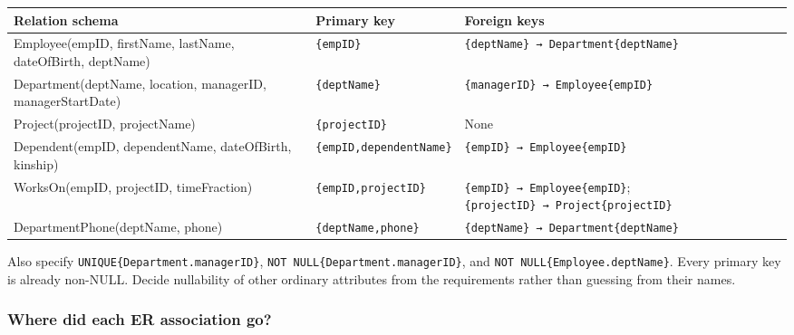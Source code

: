 \begin{longtable}[]{@{}
  >{\raggedright\arraybackslash}p{}
  >{\raggedright\arraybackslash}p{}
  >{\raggedright\arraybackslash}p{}@{}}
\toprule\noalign{}
\begin{minipage}[b]{\linewidth}\raggedright
Relation schema
\end{minipage} & \begin{minipage}[b]{\linewidth}\raggedright
Primary key
\end{minipage} & \begin{minipage}[b]{\linewidth}\raggedright
Foreign keys
\end{minipage} \\
\midrule\noalign{}
\endhead
\bottomrule\noalign{}
\endlastfoot
Employee(empID, firstName, lastName, dateOfBirth, deptName) & \texttt{\{empID\}} & \texttt{\{deptName\}\ →\ Department\{deptName\}} \\
Department(deptName, location, managerID, managerStartDate) & \texttt{\{deptName\}} & \texttt{\{managerID\}\ →\ Employee\{empID\}} \\
Project(projectID, projectName) & \texttt{\{projectID\}} & None \\
Dependent(empID, dependentName, dateOfBirth, kinship) & \texttt{\{empID,dependentName\}} & \texttt{\{empID\}\ →\ Employee\{empID\}} \\
WorksOn(empID, projectID, timeFraction) & \texttt{\{empID,projectID\}} & \texttt{\{empID\}\ →\ Employee\{empID\}}; \texttt{\{projectID\}\ →\ Project\{projectID\}} \\
DepartmentPhone(deptName, phone) & \texttt{\{deptName,phone\}} & \texttt{\{deptName\}\ →\ Department\{deptName\}} \\
\end{longtable}

Also specify \texttt{UNIQUE\{Department.managerID\}}, \texttt{NOT\ NULL\{Department.managerID\}}, and \texttt{NOT\ NULL\{Employee.deptName\}}. Every primary key is already non-NULL. Decide nullability of other ordinary attributes from the requirements rather than guessing from their names.

\subsubsection{Where did each ER association go?}\label{04_er_to_relational_mapping_en-where-did-each-er-association-go}

